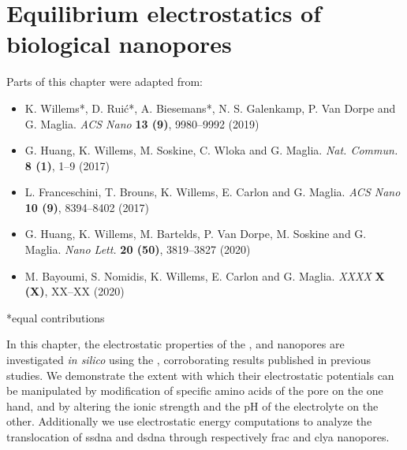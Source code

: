 \chapter{Equilibrium electrostatics of biological nanopores}
%
\label{ch:electrostatics}
%

%
%


%
%
\begin{shaded}
Parts of this chapter were adapted from:
%
\begin{itemize}
  \item K. Willems*, D. Rui\'{c}*, A. Biesemans*, N. S. Galenkamp, P. Van Dorpe and G. Maglia.
        \textit{ACS Nano} \textbf{13 (9)}, 9980--9992 (2019) %
  \item G. Huang, K. Willems, M. Soskine, C. Wloka and G. Maglia.
        \textit{Nat. Commun.} \textbf{8 (1)}, 1--9 (2017) %
  \item L. Franceschini,  T. Brouns, K. Willems, E. Carlon and G. Maglia.
        \textit{ACS Nano} \textbf{10 (9)}, 8394--8402 (2017) %
  \item G. Huang, K. Willems, M. Bartelds, P. Van Dorpe, M. Soskine and G. Maglia.
        \textit{Nano Lett.} \textbf{20 (50)}, 3819--3827 (2020) %
  \item M. Bayoumi, S. Nomidis, K. Willems, E. Carlon and G. Maglia.
        \textit{XXXX} \textbf{X (X)}, XX--XX (2020) %
\end{itemize}
%
*equal contributions
%
\newpage
\end{shaded}
%
%


In this chapter, the electrostatic properties of the ,  and 
nanopores are investigated \textit{in silico} using the , corroborating results published in
previous studies. We demonstrate the extent with which their electrostatic potentials can be manipulated by
modification of specific amino acids of the pore on the one hand, and by altering the ionic strength and the
pH of the electrolyte on the other. Additionally we use electrostatic energy computations to analyze the
translocation of \gls{ssdna} and \gls{dsdna} through respectively \gls{frac} and \gls{clya} nanopores. \\
%

